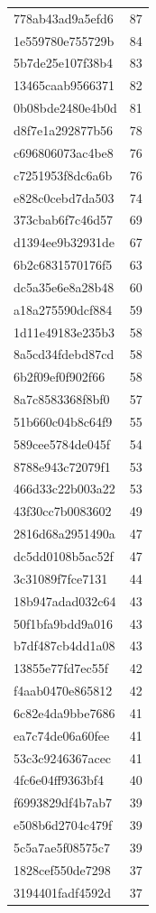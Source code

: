 \begin{tabular}{ll}
778ab43ad9a5efd6 & 87 \\
1e559780e755729b & 84 \\
5b7de25e107f38b4 & 83 \\
13465caab9566371 & 82 \\
0b08bde2480e4b0d & 81 \\
d8f7e1a292877b56 & 78 \\
c696806073ac4be8 & 76 \\
c7251953f8dc6a6b & 76 \\
e828c0cebd7da503 & 74 \\
373cbab6f7c46d57 & 69 \\
d1394ee9b32931de & 67 \\
6b2c6831570176f5 & 63 \\
dc5a35e6e8a28b48 & 60 \\
a18a275590dcf884 & 59 \\
1d11e49183e235b3 & 58 \\
8a5cd34fdebd87cd & 58 \\
6b2f09ef0f902f66 & 58 \\
8a7c8583368f8bf0 & 57 \\
51b660c04b8c64f9 & 55 \\
589cee5784de045f & 54 \\
8788e943c72079f1 & 53 \\
466d33c22b003a22 & 53 \\
43f30cc7b0083602 & 49 \\
2816d68a2951490a & 47 \\
dc5dd0108b5ac52f & 47 \\
3c31089f7fce7131 & 44 \\
18b947adad032c64 & 43 \\
50f1bfa9bdd9a016 & 43 \\
b7df487cb4dd1a08 & 43 \\
13855e77fd7ec55f & 42 \\
f4aab0470e865812 & 42 \\
6c82e4da9bbe7686 & 41 \\
ea7c74de06a60fee & 41 \\
53c3c9246367acec & 41 \\
4fc6e04ff9363bf4 & 40 \\
f6993829df4b7ab7 & 39 \\
e508b6d2704c479f & 39 \\
5c5a7ae5f08575c7 & 39 \\
1828cef550de7298 & 37 \\
3194401fadf4592d & 37 \\

\end{tabular}

